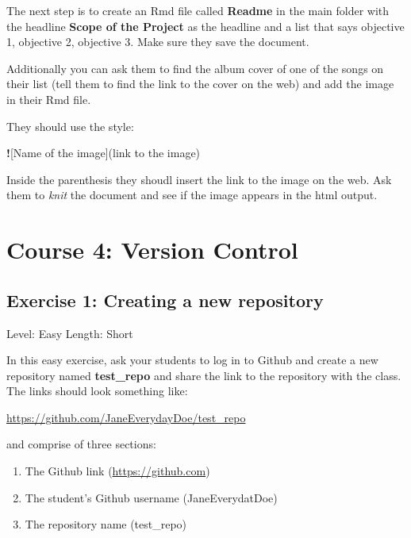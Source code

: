 \documentclass[]{book}
\newenvironment{Shaded}{\begin{snugshade}}{\end{snugshade}}
\newcommand{\NormalTok}[1]{#1}
\newcommand{\OperatorTok}[1]{\textcolor[rgb]{0.81,0.36,0.00}{\textbf{#1}}}
\providecommand{\tightlist}{%
  \setlength{\itemsep}{0pt}\setlength{\parskip}{0pt}}
\begin{document}
The next step is to create an Rmd file called \textbf{Readme} in the main folder with the headline \textbf{Scope of the Project} as the headline and a list that says objective 1, objective 2, objective 3. Make sure they save the document.

Additionally you can ask them to find the album cover of one of the songs on their list (tell them to find the link to the cover on the web) and add the image in their Rmd file.

They should use the style:

\begin{Shaded}
\begin{Highlighting}[]
\OperatorTok{!}\NormalTok{[Name of the image](link to the image)}
\end{Highlighting}
\end{Shaded}

Inside the parenthesis they shoudl insert the link to the image on the web. Ask them to \emph{knit} the document and see if the image appears in the html output.

\hypertarget{version-control}{%
\chapter*{Course 4: Version Control}\label{version-control}}

\hypertarget{exercise-1-creating-a-new-repository}{%
\section*{Exercise 1: Creating a new repository}\label{exercise-1-creating-a-new-repository}}

Level: Easy
Length: Short

In this easy exercise, ask your students to log in to Github and create a new repository named \textbf{test\_repo} and share the link to the repository with the class. The links should look something like:

\url{https://github.com/JaneEverydayDoe/test_repo}

and comprise of three sections:

\begin{enumerate}
\def\labelenumi{\arabic{enumi}.}
\tightlist
\item
  The Github link (\url{https://github.com})
\item
  The student's Github username (JaneEverydatDoe)
\item
  The repository name (test\_repo)
\end{enumerate}
\end{document}
